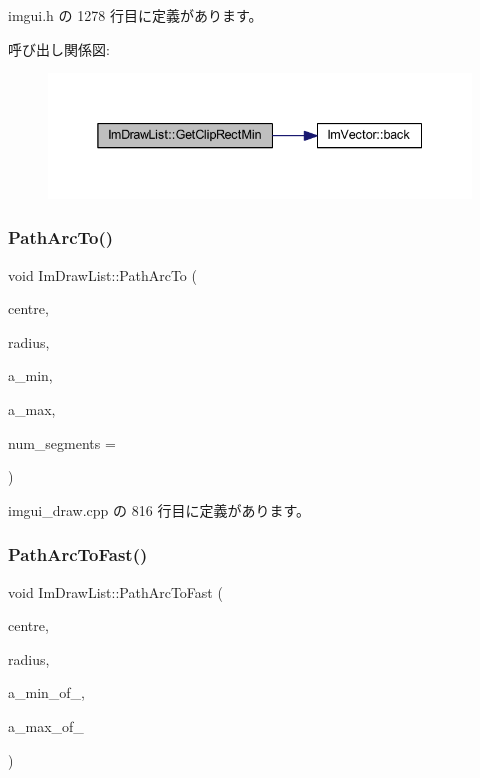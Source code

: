  imgui.\+h の 1278 行目に定義があります。

呼び出し関係図\+:\nopagebreak
\begin{figure}[H]
\begin{center}
\leavevmode
\includegraphics[width=338pt]{struct_im_draw_list_a9d83896d3eb434a9e1072d56523a2754_cgraph}
\end{center}
\end{figure}
\mbox{\label{struct_im_draw_list_acb69ef7febcc54c9e5e09d2460c85b61}} 
\subsubsection{\texorpdfstring{Path\+Arc\+To()}{PathArcTo()}}
{\footnotesize\ttfamily void Im\+Draw\+List\+::\+Path\+Arc\+To (\begin{DoxyParamCaption}\item[{const \mbox{\hyperlink{struct_im_vec2}{Im\+Vec2}} \&}]{centre,  }\item[{float}]{radius,  }\item[{float}]{a\+\_\+min,  }\item[{float}]{a\+\_\+max,  }\item[{int}]{num\+\_\+segments = {} }\end{DoxyParamCaption})}



 imgui\+\_\+draw.\+cpp の 816 行目に定義があります。

\mbox{\label{struct_im_draw_list_a713cca3862e88aa1ee671db1c4cf6bdb}} 
\subsubsection{\texorpdfstring{Path\+Arc\+To\+Fast()}{PathArcToFast()}}
{\footnotesize\ttfamily void Im\+Draw\+List\+::\+Path\+Arc\+To\+Fast (\begin{DoxyParamCaption}\item[{const \mbox{\hyperlink{struct_im_vec2}{Im\+Vec2}} \&}]{centre,  }\item[{float}]{radius,  }\item[{int}]{a\+\_\+min\+\_\+of\+\_,  }\item[{int}]{a\+\_\+max\+\_\+of\+\_ }\end{DoxyParamCaption})}



